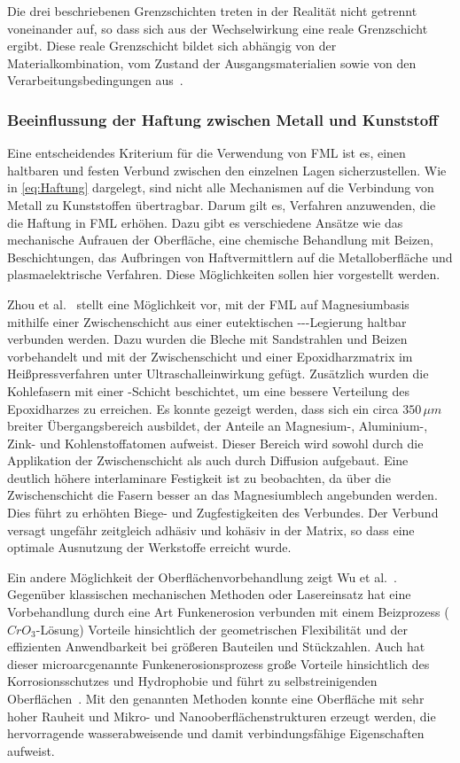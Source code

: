 Die drei beschriebenen Grenzschichten treten in der Realität nicht getrennt voneinander auf, so dass sich aus der Wechselwirkung eine reale Grenzschicht ergibt.
Diese reale Grenzschicht bildet sich abhängig von der Materialkombination, vom Zustand der Ausgangsmaterialien sowie von den Verarbeitungsbedingungen aus~\cite{Flock2012}.

\subsubsection{Beeinflussung der Haftung zwischen Metall und Kunststoff}\label{subsubsec:beeinflussung}

Eine entscheidendes Kriterium für die Verwendung von FML ist es, einen haltbaren und festen Verbund zwischen den einzelnen Lagen sicherzustellen.
Wie in \autoref{eq:Haftung} dargelegt, sind nicht alle Mechanismen auf die Verbindung von Metall zu Kunststoffen übertragbar.
Darum gilt es, Verfahren anzuwenden, die die Haftung in FML erhöhen.
Dazu gibt es verschiedene Ansätze wie das mechanische Aufrauen der Oberfläche, eine chemische Behandlung mit Beizen, Beschichtungen, das Aufbringen von Haftvermittlern auf die Metalloberfläche und plasmaelektrische Verfahren.
Diese Möglichkeiten sollen hier vorgestellt werden.

Zhou et al.~\cite{Zhou2021} stellt eine Möglichkeit vor, mit der FML auf Magnesiumbasis mithilfe einer Zwischenschicht aus einer eutektischen ---Legierung haltbar verbunden werden.
Dazu wurden die Bleche mit Sandstrahlen und Beizen vorbehandelt und mit der Zwischenschicht und einer Epoxidharzmatrix im Heißpressverfahren unter Ultraschalleinwirkung gefügt.
Zusätzlich wurden die Kohlefasern mit einer -Schicht beschichtet, um eine bessere Verteilung des Epoxidharzes zu erreichen.
Es konnte gezeigt werden, dass sich ein circa $350 \, \mu m$ breiter Übergangsbereich ausbildet, der Anteile an Magnesium-, Aluminium-, Zink- und Kohlenstoffatomen aufweist.
Dieser Bereich wird sowohl durch die Applikation der Zwischenschicht als auch durch Diffusion aufgebaut.
Eine deutlich höhere interlaminare Festigkeit ist zu beobachten, da über die Zwischenschicht die Fasern besser an das Magnesiumblech angebunden werden.
Dies führt zu erhöhten Biege- und Zugfestigkeiten des Verbundes.
Der Verbund versagt ungefähr zeitgleich adhäsiv und kohäsiv in der Matrix, so dass eine optimale Ausnutzung der Werkstoffe erreicht wurde.

Ein andere Möglichkeit der Oberflächenvorbehandlung zeigt Wu et al.~\cite{Wu2016}.
Gegenüber klassischen mechanischen Methoden oder Lasereinsatz hat eine Vorbehandlung durch eine Art Funkenerosion verbunden mit einem Beizprozess ($CrO_3$-Lösung) Vorteile hinsichtlich der geometrischen Flexibilität und der effizienten Anwendbarkeit bei größeren Bauteilen und Stückzahlen.
Auch hat dieser \glqq microarc\grqq genannte Funkenerosionsprozess große Vorteile hinsichtlich des Korrosionsschutzes und Hydrophobie und führt zu selbstreinigenden Oberflächen~\cite{Lu2015}.
Mit den genannten Methoden konnte eine Oberfläche mit sehr hoher Rauheit und Mikro- und Nanooberflächenstrukturen erzeugt werden, die hervorragende wasserabweisende und damit verbindungsfähige Eigenschaften aufweist.


